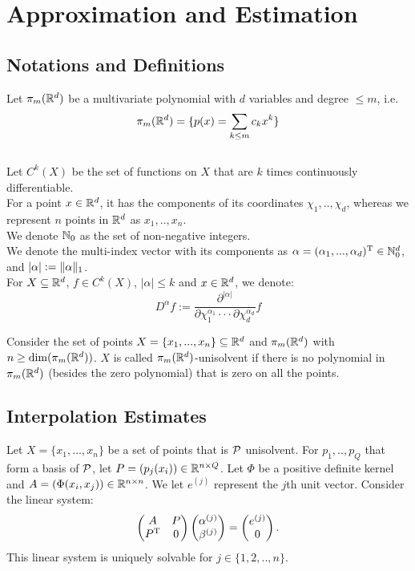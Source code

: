 \documentclass[twoside]{memoir}
\begin{document}
\chapter{Approximation and Estimation}
\section{Notations and Definitions} \label{sec:Notations}

Let $\pi_m(\mathbb{R}^d)$ be a multivariate polynomial with $d$ variables and degree $\leq m$, i.e. 
\[ \pi_m(\mathbb{R}^d) = \{ p(x) = \sum_{k \leq m} c_k x^k \} \] 	
\\
Let $C^k(X)$ be the set of functions on $X$ that are $k$ times continuously differentiable. \\
For a point $x \in \mathbb{R}^d$, it has the components of its coordinates $\chi_1, .., \chi_d$, whereas we represent $n$ points in $\mathbb{R}^d$ as $x_1, .., x_n$.\\
We denote $\mathbb{N}_0$ as the set of non-negative integers.\\
We denote the multi-index vector with its components as $\alpha = (\alpha_1, ..., \alpha_d)^{\text{T}} \in \mathbb{N}_{0}^{d}$, and $|\alpha| := \lVert\alpha\rVert_1$.\\ For $X \subseteq \mathbb{R}^d$, $f \in C^k(X)$, $|\alpha| \leq k$ and $x \in \mathbb{R}^d$, we denote:
\[ D^\alpha f := \frac{\partial^{|\alpha|}}{\partial\chi_1^{\alpha_1} \cdot\cdot\cdot \partial\chi_d^{\alpha_d}} f \]

\begin{defn}
	Consider the set of points $X = \{x_1, ..., x_n\} \subseteq \mathbb{R}^d$ and $\pi_m(\mathbb{R}^d)$ with $n \geq \dim(\pi_m(\mathbb{R}^d))$. $X$ is called $\pi_m(\mathbb{R}^d)$-unisolvent if there is no polynomial in $\pi_m(\mathbb{R}^d)$ (besides the zero polynomial) that is zero on all the points.
\end{defn}


\section{Interpolation Estimates}

Let $X = \{x_1, ..., x_n\}$ be a set of points that is $\mathcal{P}$ unisolvent. For $p_1, .., p_Q$ that form a basis of $\mathcal{P}$, let $P = (p_j(x_i)) \in \mathbb{R}^{n\times Q}$. Let $\Phi$ be a positive definite kernel and $A = (\Phi(x_i, x_j)) \in \mathbb{R}^{n\times n}$. We let $e^{(j)}$ represent the $j$th unit vector.
Consider the linear system:
\begin{equation} \label{eqn:InterpolateMat}
\begin{pmatrix}
A & P \\
P^{\text{T}} & 0 \\
\end{pmatrix}
\begin{pmatrix}
\alpha^{(j)} \\ \beta^{(j)}
\end{pmatrix}
=
\begin{pmatrix}
e^{(j)} \\ 0
\end{pmatrix}.
\end{equation}
This linear system is uniquely solvable for $j \in \{1, 2, .., n\}$.
\end{document}
